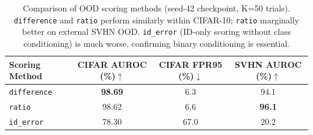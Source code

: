 \begin{table}[htbp]
    \centering
    \caption{Comparison of OOD scoring methods (seed-42 checkpoint, K=50 trials).
             \texttt{difference} and \texttt{ratio} perform similarly within CIFAR-10;
             \texttt{ratio} marginally better on external SVHN OOD.
             \texttt{id\_error} (ID-only scoring without class conditioning) is much worse,
             confirming binary conditioning is essential.}
    \label{tab:scoring-methods}
    \begin{tabular}{lccc}
        \toprule
        Scoring Method & CIFAR AUROC (\%)$\uparrow$ & CIFAR FPR95 (\%)$\downarrow$ & SVHN AUROC (\%)$\uparrow$ \\
        \midrule
        \texttt{difference} & \textbf{98.69} & 6.3 & 94.1 \\
        \texttt{ratio} & 98.62 & 6.6 & \textbf{96.1} \\
        \texttt{id\_error} & 78.30 & 67.0 & 20.2 \\
        \bottomrule
    \end{tabular}
\end{table}
